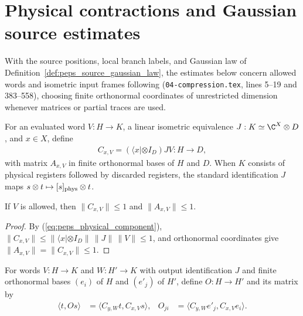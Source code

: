 \section{Physical contractions and Gaussian source estimates}

With the source positions, local branch labels, and Gaussian law of
Definition~\ref{def:peps_source_gaussian_law}, the estimates below concern
allowed words and isometric input frames following
\cite[proof of Theorem~5.2]{OpenAI2026PolynomialPEPS}
(\texttt{04-compression.tex}, lines 5--19 and 383--558), choosing finite
orthonormal coordinates of unrestricted dimension whenever matrices or partial
traces are used.

\begin{definition}
    \label{def:peps_physical_component}
    \leanok
    For an evaluated word $V:H\to K$, a linear isometric equivalence
    $J:K\simeq\C^X\otimes D$, and $x\in X$, define
    \begin{align}
        C_{x,V}=(\langle x|\otimes I_D)JV:H\longrightarrow D,
        \label{eq:peps_physical_component}
    \end{align}
    with matrix $A_{x,V}$ in finite orthonormal bases of $H$ and $D$. When $K$
    consists of physical registers followed by discarded registers, the standard
    identification $J$ maps $s\otimes t\mapsto [s]_{\rm phys}\otimes t$.
\end{definition}

\begin{lemma}
    \label{thm:peps_physical_component_contraction}
    \leanok
    If $V$ is allowed, then $\|C_{x,V}\|\leq1$ and $\|A_{x,V}\|\leq1$.
\end{lemma}

\begin{proof}\leanok
    By (\ref{eq:peps_physical_component}),
    $\|C_{x,V}\|\leq\|\langle x|\otimes I_D\|\,\|J\|\,\|V\|\leq1$, and
    orthonormal coordinates give $\|A_{x,V}\|=\|C_{x,V}\|\le 1$.
\end{proof}

\begin{definition}
    \label{def:peps_physical_gram}
    \leanok
    For words $V:H\to K$ and $W:H'\to K$ with output identification $J$ and
    finite orthonormal bases $(e_i)$ of $H$ and $(e'_j)$ of $H'$, define
    $O:H\to H'$ and its matrix by
    \begin{align}
        \langle t,Os\rangle & =\langle C_{y,W}t,C_{x,V}s\rangle,      &
        O_{ji}              & =\langle C_{y,W}e'_j,C_{x,V}e_i\rangle.
        \label{eq:peps_physical_gram}
    \end{align}
\end{definition}

